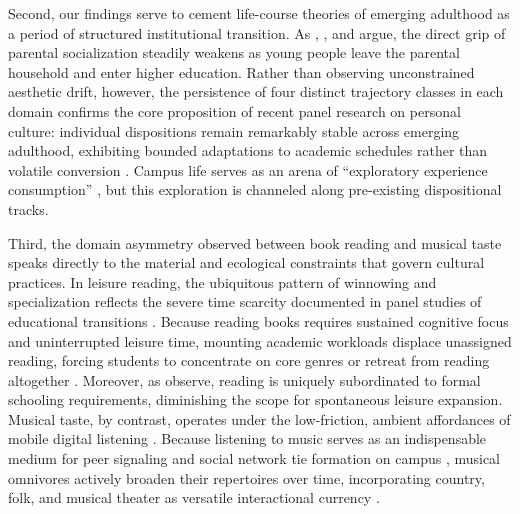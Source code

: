 \documentclass[12pt]{article}
\begin{document}
Second, our findings serve to cement life-course theories of emerging adulthood as a period of structured institutional transition. As \citet{meuleman2018parental}, \citet{nagel2002participation}, and \citet{nagel2010cultural} argue, the direct grip of parental socialization steadily weakens as young people leave the parental household and enter higher education. Rather than observing unconstrained aesthetic drift, however, the persistence of four distinct trajectory classes in each domain confirms the core proposition of recent panel research on personal culture: individual dispositions remain remarkably stable across emerging adulthood, exhibiting bounded adaptations to academic schedules rather than volatile conversion \citep{vaisey2016cultural-867,kiley2020measuring-123,vaisey2021model-based-deb}. Campus life serves as an arena of ``exploratory experience consumption'' \citep{weinberger2017consuming}, but this exploration is channeled along pre-existing dispositional tracks.

Third, the domain asymmetry observed between book reading and musical taste speaks directly to the material and ecological constraints that govern cultural practices. In leisure reading, the ubiquitous pattern of winnowing and specialization reflects the severe time scarcity documented in panel studies of educational transitions \citep{nagel2012reading,kraaykamp2003literary}. Because reading books requires sustained cognitive focus and uninterrupted leisure time, mounting academic workloads displace unassigned reading, forcing students to concentrate on core genres or retreat from reading altogether \citep{chalari2022adolescents,sokolova2020does-65c}. Moreover, as \citet{meuleman2018parental} observe, reading is uniquely subordinated to formal schooling requirements, diminishing the scope for spontaneous leisure expansion. Musical taste, by contrast, operates under the low-friction, ambient affordances of mobile digital listening \citep{webster2020taste,denora2000music-0f0}. Because listening to music serves as an indispensable medium for peer signaling and social network tie formation on campus \citep{lewis2018conversion}, musical omnivores actively broaden their repertoires over time, incorporating country, folk, and musical theater as versatile interactional currency \citep{lizardo2006how}.
\end{document}
